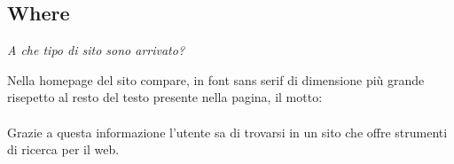 \subsection{Where}
\begin{center}

\textit{A che tipo di sito sono arrivato?}

Nella homepage del sito compare, in font sans serif di dimensione
più grande risepetto al resto del testo presente nella pagina, il motto: \\
 \\
Grazie a questa informazione l'utente sa di trovarsi in un sito che offre
strumenti di ricerca per il web.

\end{center}